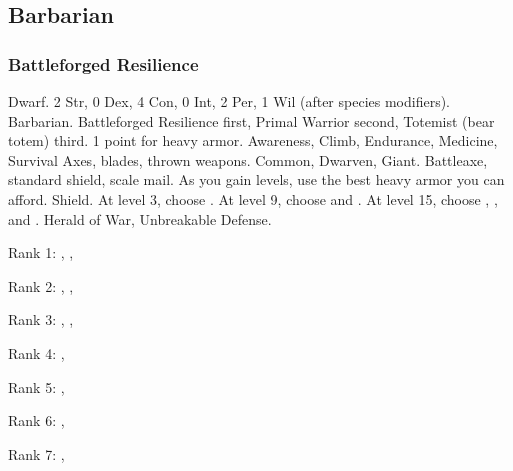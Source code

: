     \subsection{Barbarian}

        \subsubsection{Battleforged Resilience}
             Dwarf.
             2 Str, 0 Dex, 4 Con, 0 Int, 2 Per, 1 Wil (after species modifiers).
             Barbarian.
             Battleforged Resilience first, Primal Warrior second, Totemist (bear totem) third.
             1 point for heavy armor.
             Awareness, Climb, Endurance, Medicine, Survival
             Axes, blades, thrown weapons.
             Common, Dwarven, Giant.
             Battleaxe, standard shield, scale mail. As you gain levels, use the best heavy armor you can afford.
             Shield.
                At level 3, choose .
                At level 9, choose  and .
                At level 15, choose , , and .
             Herald of War, Unbreakable Defense.
            \begin{raggeditemize}
                \item Rank 1: , , 
                \item Rank 2: , , 
                \item Rank 3: , , 
                \item Rank 4: , 
                \item Rank 5: , 
                \item Rank 6: , 
                \item Rank 7: , 
            \end{raggeditemize}
